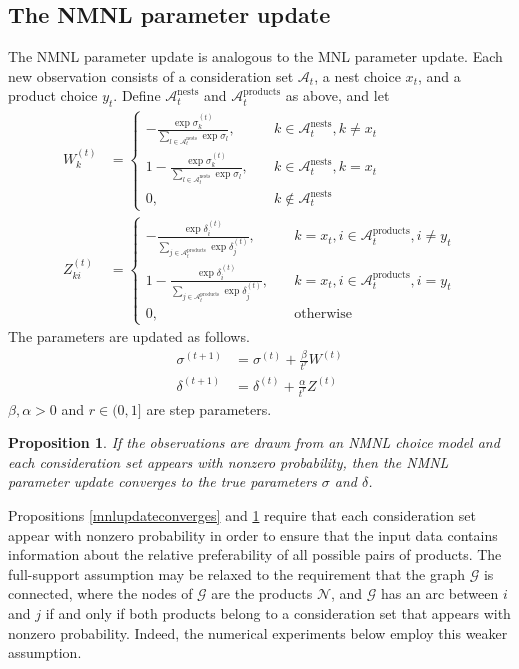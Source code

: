 \documentclass[preprint,12pt,authoryear]{elsarticle}
\newtheorem{proposition}{Proposition}
\begin{document}
\subsection{The NMNL parameter update}
The NMNL parameter update is analogous to the MNL parameter update. Each new observation consists of a consideration set $\mathcal{A}_t$, a nest choice $x_t$, and a product choice $y_t$. Define $\mathcal{A}_t^{\text{nests}}$ and $\mathcal{A}_{t}^{\text{products}}$ as above, and let
\begin{align}
W^{(t)}_k &= \begin{cases}
 -  \frac{\exp \sigma^{(t)}_k}{\sum_{l\in \mathcal{A}_{t}^{\text{nests}}} \exp \sigma_l}, \quad & k \in \mathcal{A}_{t}^{\text{nests}}, k \neq x_t\\
1 -  \frac{\exp \sigma^{(t)}_k}{\sum_{l\in \mathcal{A}_{t}^{\text{nests}}} \exp \sigma_l}, \quad & k \in \mathcal{A}_{t}^{\text{nests}}, k = x_t\\
0, \quad & k \notin \mathcal{A}_{t}^{\text{nests}}
\end{cases} \\
Z^{(t)}_{ki} &= 
\begin{cases}
 - \frac{\exp \delta^{(t)}_i}{\sum_{j\in \mathcal{A}_t^{\text{products}}} \exp \delta^{(t)}_j}, \quad&k = x_t, i \in \mathcal{A}_t^{\text{products}}, i\neq y_t \\
1 - \frac{\exp \delta^{(t)}_i}{\sum_{j\in \mathcal{A}_t^{\text{products}}} \exp \delta^{(t)}_j} , \quad&k = x_t, i \in \mathcal{A}_t^{\text{products}}, i =  y_t \\
0, \quad & \text{otherwise}
\end{cases}
\end{align}
The parameters are updated as follows.
\begin{align}\label{nmnlparameterupdate}
\sigma^{(t+1)} &= \sigma^{(t)} + \frac{\beta}{t^r} W^{(t)} \\
\delta^{(t+1)} &= \delta^{(t)} +  \frac{\alpha}{t^r} Z^{(t)} 
\end{align}
$\beta, \alpha >0$ and $r \in (0, 1]$ are step parameters.

\begin{proposition} \label{nmnlupdateconverges}
If the observations are drawn from an NMNL choice model and each consideration set appears with nonzero probability, then the NMNL parameter update converges to the true parameters $\sigma$ and $\delta$.\end{proposition}

Propositions \ref{mnlupdateconverges} and \ref{nmnlupdateconverges} require that each consideration set appear with nonzero probability in order to ensure that the input data contains information about the relative preferability of all possible pairs of products. The full-support assumption may be relaxed to the requirement that the graph $\mathcal{G}$ is connected, where the nodes of $\mathcal{G}$ are the products $\mathcal{N}$, and $\mathcal{G}$ has an arc between $i$ and $j$ if and only if both products belong to a consideration set that appears with nonzero probability. Indeed, the numerical experiments below employ this weaker assumption.
\end{document}
